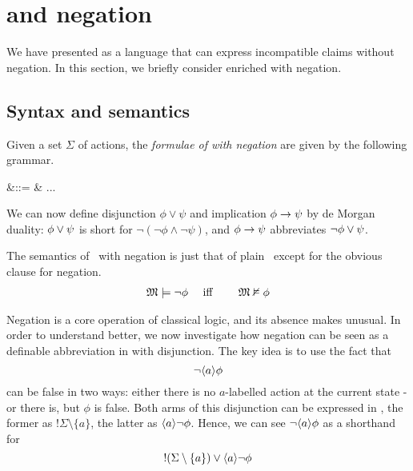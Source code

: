 \section{\Cathoristic{} and negation}\label{ELAndNegation}

\NI We have presented \cathoristic{} as a language that can express
incompatible claims without negation.  In this section, we briefly
consider \cathoristic{} enriched with negation.

\subsection{Syntax and semantics}

\begin{definition}
Given a set $\Sigma$ of actions, the \emph{formulae of \cathoristic{}
  with negation} are given by the following grammar.
\begin{GRAMMAR}
  \phi 
     &\quad ::= \quad & 
   ... \fOr \neg \phi
\end{GRAMMAR}

\NI We can now define disjunction $\phi \lor \psi$ and implication
$\phi \rightarrow \psi$ by de Morgan duality: $\phi \lor \psi$ is short
for $\neg (\neg \phi \land \neg \psi )$, and $\phi \rightarrow \psi$  abbreviates
$\neg\phi \lor \psi$.
\end{definition}

The semantics of \cathoristic\ with negation is just that of plain
\cathoristic\, except for the obvious clause for negation.
\begin{eqnarray*}
\frak{M} \models \neg \phi &\quad\mbox{ iff }\quad& \frak{M} \nvDash \phi  
\end{eqnarray*}

\NI Negation is a core operation of classical logic, and its absence makes
\cathoristic{} unusual. In order to understand \cathoristic{} better, we
now investigate how negation can be seen as a definable abbreviation
in \cathoristic{} with disjunction. The key idea is to use the fact that
\[
   \neg \langle a \rangle \phi
\]
can be false in two ways: either there is no $a$-labelled action at
the current state - or there is, but $\phi$ is false. Both arms of
this disjunction can be expressed in \cathoristic{}, the former as
$!\Sigma \setminus \{a\}$, the latter as $\langle a \rangle \neg \phi$.
 Hence, we can see $\neg \langle a \rangle \phi$ as a shorthand for 
\[
   !(\Sigma \setminus \{a\}) \lor \langle a \rangle \neg \phi
\]

